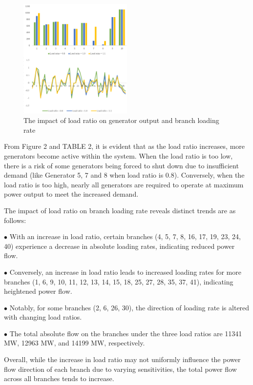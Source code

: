 \documentclass[lettersize,journal]{IEEEtran}
\begin{document}
\begin{figure}[htbp]
	\centering
	\includegraphics[width=0.5\textwidth]{t1-loadratio}
	\caption{The impact of load ratio on generator output and branch loading rate}
	\label{fig_2}
\end{figure}


From Figure 2 and TABLE 2, it is evident that as the load ratio increases, more generators become active within the system. When the load ratio is too low, there is a risk of some generators being forced to shut down due to insufficient demand (like Generator 5, 7 and 8 when load ratio is 0.8). Conversely, when the load ratio is too high, nearly all generators are required to operate at maximum power output to meet the increased demand.

The impact of load ratio on branch loading rate reveals distinct trends are as follows:

$\bullet$ With an increase in load ratio, certain branches (4, 5, 7, 8, 16, 17, 19, 23, 24, 40) experience a decrease in absolute loading rates, indicating reduced power flow.

$\bullet$ Conversely, an increase in load ratio leads to increased loading rates for more branches (1, 6, 9, 10, 11, 12, 13, 14, 15, 18, 25, 27, 28, 35, 37, 41), indicating heightened power flow.

$\bullet$ Notably, for some branches (2, 6, 26, 30), the direction of loading rate is altered with changing load ratios.

$\bullet$ The total absolute flow on the branches under the three load ratios are 11341 MW, 12963 MW, and 14199 MW, respectively.

Overall, while the increase in load ratio may not uniformly influence the power flow direction of each branch due to varying sensitivities, the total power flow across all branches tends to increase.
\end{document}

